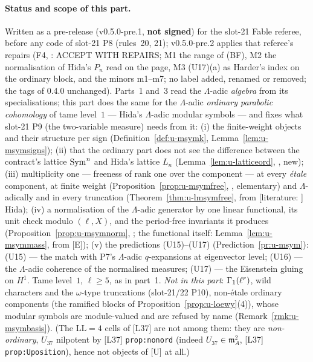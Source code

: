 \documentclass[11pt]{article}
\newcommand{\LIT}[1]{\textsf{[literature: #1]}}   %
\newcommand{\Iw}{\Lambda}                         %
\newcommand{\LL}{\mathrm{LL}}                     %
\begin{document}
\paragraph{Status and scope of this part.} Written as a pre-release (v0.5.0-pre.1, \textbf{not signed}) for the slot-21 Fable referee, before any code of
slot-21 P8 (rules~20, 21); v0.5.0-pre.2 applies that referee's repairs (F4, : ACCEPT WITH REPAIRS; M1 the range of (BF),
M2 the normalisation of Hida's $P_n$ read on the page, M3 (U17)(a) as Harder's index on the ordinary block, and the minors m1--m7; no label added, renamed or removed; the
tags of 0.4.0 unchanged). Parts~1 and~3 read the $\Iw$-adic \emph{algebra} from its specialisations; this part does the same for the $\Iw$-adic
\emph{ordinary parabolic cohomology} of tame level~$1$ --- Hida's $\Iw$-adic modular symbols --- and fixes what slot-21 P9 (the two-variable measure) needs
from it: (i) the finite-weight objects and their structure per sign (Definition~\ref{def:u-msymk}, Lemma~\ref{lem:u-msymsigns}); (ii) that the ordinary
part does not see the difference between the contract's lattice $\mathrm{Sym}^{n}$ and Hida's lattice $L_n$ (Lemma~\ref{lem:u-latticeord}, \PROVED, new);
(iii) multiplicity one --- freeness of rank one over the component --- at every \emph{étale} component, at finite weight (Proposition~\ref{prop:u-msymfree},
\PROVED, elementary) and $\Iw$-adically and in every truncation (Theorem~\ref{thm:u-lmsymfree}, \PROVED{} from \LIT{} Hida); (iv) a normalisation of the
$\Iw$-adic generator by one linear functional, its unit check modulo $(\ell,X)$, and the period-free invariants it produces
(Proposition~\ref{prop:u-msymnorm}, \PROVED; the functional itself: Lemma~\ref{lem:u-msymmass}, \PROVED{} from [E]); (v) the predictions (U15)--(U17)
(Prediction~\ref{pr:u-msym}): (U15) \PROVED{} --- the match with P7's $\Iw$-adic $q$-expansions at eigenvector level; (U16) \CONJ{} --- the
$\Iw$-adic coherence of the normalised measures; (U17) \CONJ{} --- the Eisenstein gluing on $H^{1}$. Tame level~$1$, $\ell\ge5$, as in part~1. \emph{Not in this
part}: $\Gamma_1(\ell^{r})$, wild characters and the $\omega$-type truncations (slot-21/22 P10), non-étale ordinary components (the ramified blocks of
Proposition~\ref{prop:u-loewy}(4)), whose modular symbols are module-valued and are refused by name (Remark~\ref{rmk:u-msymbasis}). (The ${\LL}=4$ cells of [L37] are not among them: they are \emph{non-ordinary}, $U_{37}$ nilpotent by [L37] \texttt{prop:nonord} (indeed $U_{37}\in\mathfrak m_A^{2}$, [L37] \texttt{prop:Uposition}), hence not objects of [U] at all.)
\end{document}
